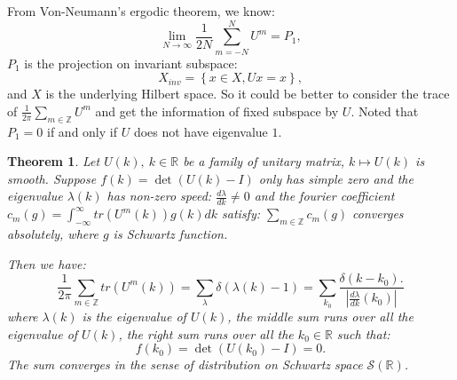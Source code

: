 \documentclass[draft]{article}
\newtheorem{thm}{Theorem}[section]
\theoremstyle{definition}
\theoremstyle{remark}
\newcommand{\R}{\mathbb{R}}
\newcommand{\Z}{\mathbb{Z}}
\begin{document}
From Von-Neumann's ergodic theorem, we know:
$$
\lim_{N\to \infty}\frac{1}{2N}\sum_{m=-N}^{N}U^{m}=P_1,
$$
$P_1$ is the projection on invariant subspace:
$$
X_{inv}=\left\lbrace x\in X, Ux=x \right\rbrace,
$$
and $X$ is the underlying Hilbert space. So it could be better to consider the trace of $\frac{1}{2\pi}\sum_{m\in \Z}U^{m}$ and get the information of fixed subspace by $U$. Noted that $P_1=0$ if and only if $U$ does not have eigenvalue $1$.
\begin{thm}
	Let $U\left(k\right),\ k\in\R$ be a family of unitary matrix, $k \mapsto U\left(k\right)$ is smooth. Suppose $f\left(k\right)=\det\left(U\left(k\right)-I\right)$ only has simple zero and the eigenvalue $\lambda\left(k\right)$ has non-zero speed: $\frac{d\lambda}{dk}\neq 0$ and the fourier coefficient $c_m\left(g\right) =\int_{-\infty}^{\infty}tr\left( U^m\left(k\right)\right)g\left(k\right)dk$ satisfy: $\sum_{m\in \Z}c_m\left(g\right)$ converges absolutely, where $g$ is Schwartz function.
	
	Then we have:
	$$
	\frac{1}{2\pi}\sum_{m\in \Z}tr\left( U^m\left(k\right)\right)  =\sum_{\lambda}\delta\left(\lambda\left(k\right) -1\right)=\sum_{k_0}\frac{\delta\left(k-k_0\right).}{\left|\frac{d\lambda}{dk}(k_0)\right| }
	$$
	where $\lambda\left(k\right)$ is the eigenvalue of $U\left(k\right)$, the middle sum runs over all the eigenvalue of $U\left(k\right)$, the right sum runs over all the $k_0\in \R$ such that:
	$$f\left(k_0\right)=\det\left(U\left(k_0\right)-I\right)=0.$$
	The sum converges in the sense of distribution on Schwartz space $\mathcal{S}\left(\R\right) $.
\end{thm}
\end{document}
